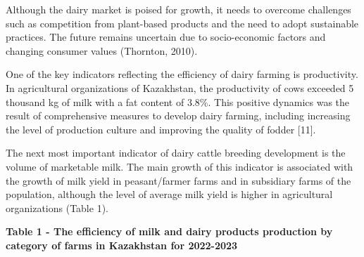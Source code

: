 \begin{multicols}{2}
Although the dairy market is poised for growth, it needs to overcome
challenges such as competition from plant-based products and the need to
adopt sustainable practices. The future remains uncertain due to
socio-economic factors and changing consumer values (Thornton, 2010).

One of the key indicators reflecting the efficiency of dairy farming is
productivity. In agricultural organizations of Kazakhstan, the
productivity of cows exceeded 5 thousand kg of milk with a fat content
of 3.8\%. This positive dynamics was the result of comprehensive
measures to develop dairy farming, including increasing the level of
production culture and improving the quality of fodder {[}11{]}.

The next most important indicator of dairy cattle breeding development
is the volume of marketable milk. The main growth of this indicator is
associated with the growth of milk yield in peasant/farmer farms and in
subsidiary farms of the population, although the level of average milk
yield is higher in agricultural organizations (Table 1).
\end{multicols}

{\bfseries Table 1 - The efficiency of milk and dairy products production by category of farms in Kazakhstan for 2022-2023}

